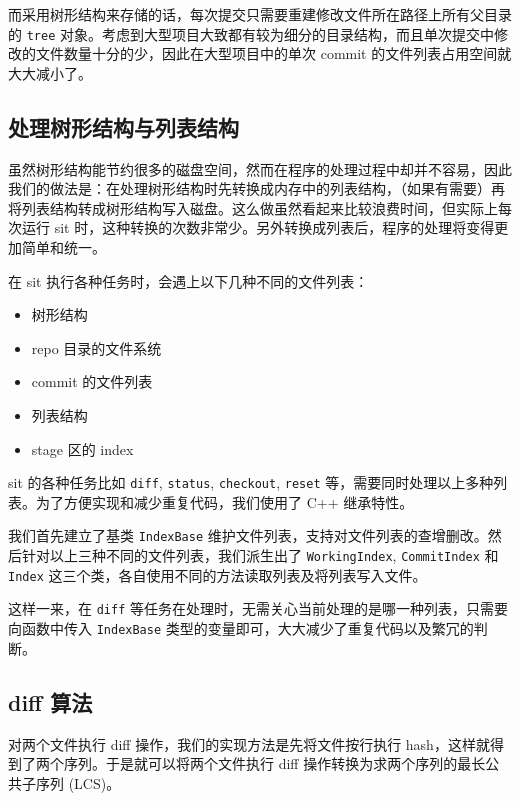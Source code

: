 而采用树形结构来存储的话，每次提交只需要重建修改文件所在路径上所有父目录的
\texttt{tree}
对象。考虑到大型项目大致都有较为细分的目录结构，而且单次提交中修改的文件数量十分的少，因此在大型项目中的单次
commit 的文件列表占用空间就大大减小了。

\subsection{处理树形结构与列表结构}\label{ux5904ux7406ux6811ux5f62ux7ed3ux6784ux4e0eux5217ux8868ux7ed3ux6784}

虽然树形结构能节约很多的磁盘空间，然而在程序的处理过程中却并不容易，因此我们的做法是：在处理树形结构时先转换成内存中的列表结构，（如果有需要）再将列表结构转成树形结构写入磁盘。这么做虽然看起来比较浪费时间，但实际上每次运行
sit
时，这种转换的次数非常少。另外转换成列表后，程序的处理将变得更加简单和统一。

在 sit 执行各种任务时，会遇上以下几种不同的文件列表：

\begin{itemize}
\itemsep1pt\parskip0pt
\item
  树形结构
\item
  repo 目录的文件系统
\item
  commit 的文件列表
\item
  列表结构
\item
  stage 区的 index
\end{itemize}

sit 的各种任务比如 \texttt{diff}, \texttt{status}, \texttt{checkout},
\texttt{reset}
等，需要同时处理以上多种列表。为了方便实现和减少重复代码，我们使用了 C++
继承特性。

我们首先建立了基类 \texttt{IndexBase}
维护文件列表，支持对文件列表的查增删改。然后针对以上三种不同的文件列表，我们派生出了
\texttt{WorkingIndex}, \texttt{CommitIndex} 和 \texttt{Index}
这三个类，各自使用不同的方法读取列表及将列表写入文件。

这样一来，在 \texttt{diff}
等任务在处理时，无需关心当前处理的是哪一种列表，只需要向函数中传入
\texttt{IndexBase} 类型的变量即可，大大减少了重复代码以及繁冗的判断。

\subsection{diff 算法}\label{diff-ux7b97ux6cd5}

对两个文件执行 diff 操作，我们的实现方法是先将文件按行执行
hash，这样就得到了两个序列。于是就可以将两个文件执行 diff
操作转换为求两个序列的最长公共子序列 (LCS)。

